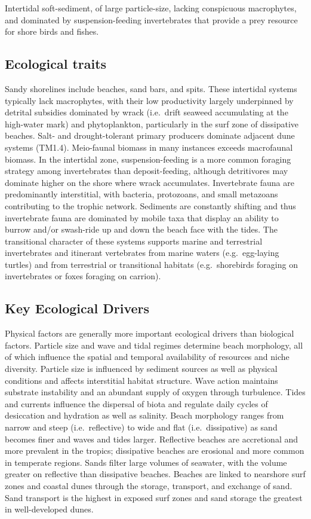 \documentclass[
  letterpaper,
  DIV=11,
  numbers=noendperiod]{scrartcl}
\begin{document}
Intertidal soft-sediment, of large particle-size, lacking conspicuous
macrophytes, and dominated by suspension-feeding invertebrates that
provide a prey resource for shore birds and fishes.

\subsection{Ecological traits}\label{ecological-traits-54}

Sandy shorelines include beaches, sand bars, and spits. These intertidal
systems typically lack macrophytes, with their low productivity largely
underpinned by detrital subsidies dominated by wrack (i.e.~drift seaweed
accumulating at the high-water mark) and phytoplankton, particularly in
the surf zone of dissipative beaches. Salt- and drought-tolerant primary
producers dominate adjacent dune systems (TM1.4). Meio-faunal biomass in
many instances exceeds macrofaunal biomass. In the intertidal zone,
suspension-feeding is a more common foraging strategy among
invertebrates than deposit-feeding, although detritivores may dominate
higher on the shore where wrack accumulates. Invertebrate fauna are
predominantly interstitial, with bacteria, protozoans, and small
metazoans contributing to the trophic network. Sediments are constantly
shifting and thus invertebrate fauna are dominated by mobile taxa that
display an ability to burrow and/or swash-ride up and down the beach
face with the tides. The transitional character of these systems
supports marine and terrestrial invertebrates and itinerant vertebrates
from marine waters (e.g.~egg-laying turtles) and from terrestrial or
transitional habitats (e.g.~shorebirds foraging on invertebrates or
foxes foraging on carrion).

\subsection{Key Ecological Drivers}\label{key-ecological-drivers-54}

Physical factors are generally more important ecological drivers than
biological factors. Particle size and wave and tidal regimes determine
beach morphology, all of which influence the spatial and temporal
availability of resources and niche diversity. Particle size is
influenced by sediment sources as well as physical conditions and
affects interstitial habitat structure. Wave action maintains substrate
instability and an abundant supply of oxygen through turbulence. Tides
and currents influence the dispersal of biota and regulate daily cycles
of desiccation and hydration as well as salinity. Beach morphology
ranges from narrow and steep (i.e.~reflective) to wide and flat
(i.e.~dissipative) as sand becomes finer and waves and tides larger.
Reflective beaches are accretional and more prevalent in the tropics;
dissipative beaches are erosional and more common in temperate regions.
Sands filter large volumes of seawater, with the volume greater on
reflective than dissipative beaches. Beaches are linked to nearshore
surf zones and coastal dunes through the storage, transport, and
exchange of sand. Sand transport is the highest in exposed surf zones
and sand storage the greatest in well-developed dunes.
\end{document}
